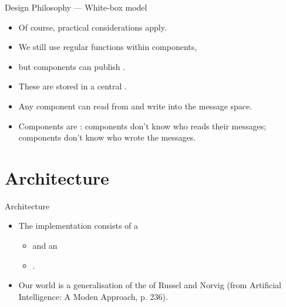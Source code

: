    \begin{frame}{Design Philosophy --- White-box model}
      \begin{itemize}
         \item Of course, practical considerations apply.
         \medskip
         \item We still use regular functions within components,
         \item but components can publish .
         \medskip
         \item These are stored in a central .
         \medskip
         \item Any component can read from and write into the message space.
         \vspace{8mm}
         \item Components are :
         \resitem components don't know who reads their messages;\\
         \resitem components don't know who wrote the messages.
      \end{itemize}
   \end{frame}
   
   \section{Architecture}
   
   \begin{frame}{Architecture}
      \begin{itemize}
         \item The implementation consists of a
         \begin{itemize}
            \item {} and an
            \item {}.
         \end{itemize}
         
         \medskip
         \item Our world is a generalisation of the  of Russel and Norvig (from Artificial Intelligence: A Moden Approach, p. 236).
      \end{itemize}
   \end{frame}
   
